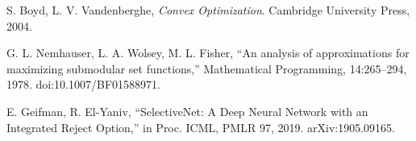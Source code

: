 \begin{thebibliography}{99}
S. Boyd, L. V. Vandenberghe, \emph{Convex Optimization}. Cambridge University Press, 2004.

G. L. Nemhauser, L. A. Wolsey, M. L. Fisher, ``An analysis of approximations for maximizing submodular set functions,'' Mathematical Programming, 14:265--294, 1978. doi:10.1007/BF01588971.

E. Geifman, R. El-Yaniv, ``SelectiveNet: A Deep Neural Network with an Integrated Reject Option,'' in Proc. ICML, PMLR 97, 2019. arXiv:1905.09165.

\end{thebibliography}

